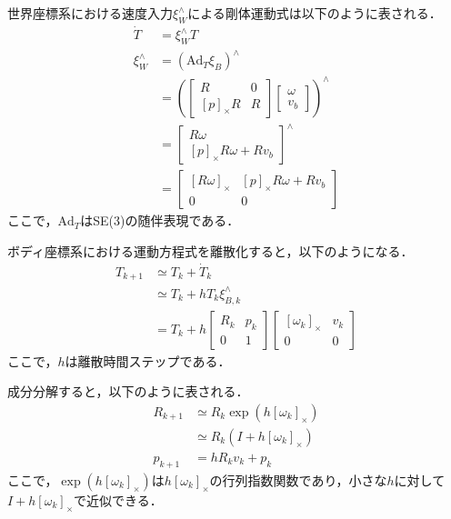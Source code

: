 世界座標系における速度入力$\xi^\wedge_W$による剛体運動式は以下のように表される．
\begin{equation}
\begin{aligned}
\dot{T} &= \xi^\wedge_W T \\
\xi_W^\wedge &= (\mathrm{Ad}_T \xi_B)^\wedge \\
&= \left( \begin{bmatrix}
R & 0 \\
[p]_\times R & R
\end{bmatrix}
\begin{bmatrix}
\omega \\
v_b
\end{bmatrix} \right)^\wedge \\
&= \begin{bmatrix}
R\omega \\
[p]_\times R\omega + Rv_b
\end{bmatrix}^\wedge \\
&= \begin{bmatrix}
[R\omega]_\times & [p]_\times R\omega + Rv_b \\
0 & 0
\end{bmatrix}
\label{eq:se3_dynamics_world}
\end{aligned}
\end{equation}
ここで，$\mathrm{Ad}_T$はSE(3)の随伴表現である．

ボディ座標系における運動方程式を離散化すると，以下のようになる．
\begin{equation}
\begin{aligned}
T_{k+1} &\simeq T_k + \dot{T}_k \\
&\simeq T_k + h T_k \xi^\wedge_{B,k} \\
&= T_k + h \begin{bmatrix}
R_k & p_k \\
0 & 1
\end{bmatrix}
\begin{bmatrix}
[\omega_k]_\times & v_k \\
0 & 0
\end{bmatrix}
\label{eq:se3_discrete}
\end{aligned}
\end{equation}
ここで，$h$は離散時間ステップである．

成分分解すると，以下のように表される．
\begin{equation}
\begin{aligned}
R_{k+1} &\simeq R_k \exp(h[\omega_k]_{\times}) \\
&\simeq R_k(I + h[\omega_k]_{\times}) \\
p_{k+1} &= h R_k v_k + p_k
\label{eq:se3_discrete_components}
\end{aligned}
\end{equation}
ここで，$\exp(h[\omega_k]_{\times})$は$h[\omega_k]_{\times}$の行列指数関数であり，小さな$h$に対して$I + h[\omega_k]_{\times}$で近似できる．

